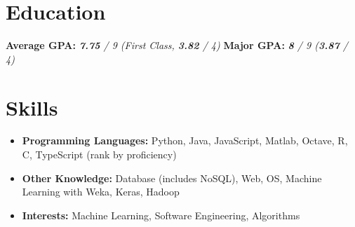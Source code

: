 \documentclass{resume}
\begin{document}



\section{Education}
\textbf{Average GPA:} \textit{\textbf{7.75} / 9 (First Class, \textbf{3.82} / 4)} \hspace{0.6cm} \textbf{Major GPA:} \textit{\textbf{8} / 9 (\textbf{3.87} / 4)}

\section{Skills}
\begin{itemize}[parsep=0.5ex]
  \item \textbf{Programming Languages:} Python, Java, JavaScript, Matlab, Octave, R, C, TypeScript (rank by proficiency)
  \item \textbf{Other Knowledge:} Database (includes NoSQL), Web, OS, Machine Learning with Weka, Keras, Hadoop
  \item \textbf{Interests:} Machine Learning, Software Engineering, Algorithms
\end{itemize}
\end{document}
